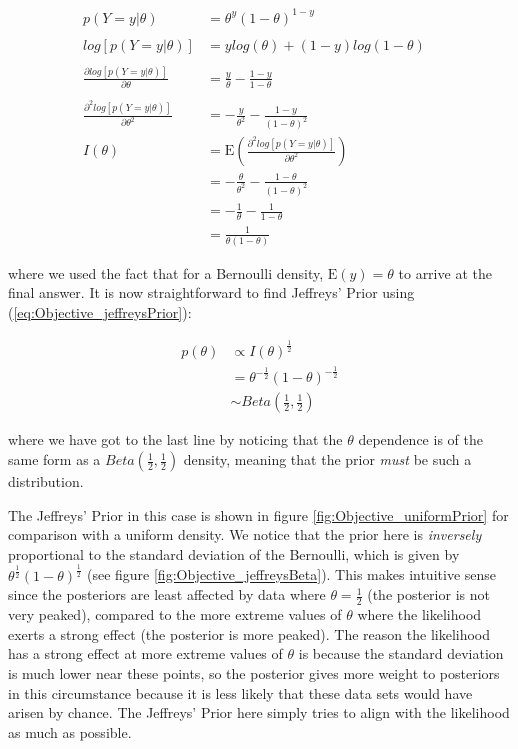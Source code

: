\documentclass[11pt,fullpage]{book}
\begin{document}
\begin{equation}
\begin{align}
p(Y=y|\theta) &= \theta^y (1-\theta)^{1-y}\\
&\\
log\left[p(Y=y|\theta)\right] &= y log(\theta) + (1-y)log(1-\theta)\\
&\\
\frac{\partial log\left[p(Y=y|\theta)\right] }{\partial \theta} &= \frac{y}{\theta} - \frac{1-y}{1-\theta}\\
&\\
\frac{\partial^2 log\left[p(Y=y|\theta)\right] }{\partial \theta^2} &= -\frac{y}{\theta^2} - \frac{1-y}{(1-\theta)^2}
&\\
I(\theta) &= \mathrm{E}\left(\frac{\partial^2 log\left[p(Y=y|\theta)\right] }{\partial \theta^2}\right)\\
&= -\frac{\theta}{\theta^2} - \frac{1-\theta}{(1-\theta)^2}\\
&= -\frac{1}{\theta} - \frac{1}{1-\theta}\\
&= \frac{1}{\theta(1-\theta)}
\end{align}
\end{equation}

where we used the fact that for a Bernoulli density, $\mathrm{E}(y)=\theta$ to arrive at the final answer. It is now straightforward to find Jeffreys' Prior using (\ref{eq:Objective_jeffreysPrior}):

\begin{equation}
\begin{align}
p(\theta) &\propto I(\theta)^{\frac{1}{2}}\\
&= \theta^{-\frac{1}{2}} (1-\theta)^{-\frac{1}{2}}\\
&\sim Beta\left(\frac{1}{2},\frac{1}{2}\right)
\end{align}
\end{equation}

where we have got to the last line by noticing that the $\theta$ dependence is of the same form as a $Beta\left(\frac{1}{2},\frac{1}{2}\right)$ density, meaning that the prior \textit{must} be such a distribution.

The Jeffreys' Prior in this case is shown in figure \ref{fig:Objective_uniformPrior} for comparison with a uniform density. We notice that the prior here is \textit{inversely} proportional to the standard deviation of the Bernoulli, which is given by $\theta^\frac{1}{2}(1-\theta)^\frac{1}{2}$ (see figure \ref{fig:Objective_jeffreysBeta}). This makes intuitive sense since the posteriors are least affected by data where $\theta=\frac{1}{2}$ (the posterior is not very peaked), compared to the more extreme values of $\theta$ where the likelihood exerts a strong effect (the posterior is more peaked). The reason the likelihood has a strong effect at more extreme values of $\theta$ is because the standard deviation is much lower near these points, so the posterior gives more weight to posteriors in this circumstance because it is less likely that these data sets would have arisen by chance. The Jeffreys' Prior here simply tries to align with the likelihood as much as possible. 
\end{document}
